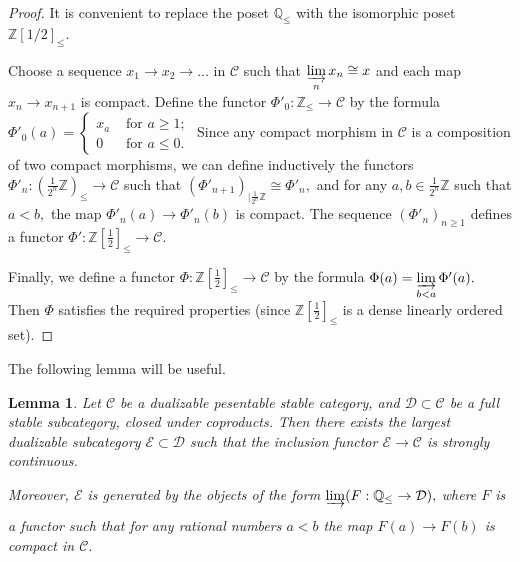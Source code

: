 \documentclass[11pt,leqno]{amsart}
\newtheorem{lemma}[theo]{Lemma}
\numberwithin{equation}{section}
\def\Z{\mathbb{Z}}
\def\Q{\mathbb{Q}}
\newcommand{\indlim}[1][]{\mathop{\varinjlim}\limits_{#1}}
\newcommand{\cD}{{\mathcal D}}
\newcommand{\cC}{{\mathcal C}}
\newcommand{\cE}{{\mathcal E}}
\begin{document}
\begin{proof}It is convenient to replace the poset $\Q_{\leq}$ with the isomorphic poset $\Z[1/2]_{\leq}.$

Choose a sequence $x_1\to x_2\to\dots$ in $\cC$ such that $\indlim[n] x_n\cong x$ and each map $x_n\to x_{n+1}$ is compact. Define the functor $\Phi'_0:\Z_{\leq}\to \cC$ by the formula $\Phi'_0(a)=\begin{cases}x_a & \text{ for }a\geq 1;\\
0 & \text{ for }a\leq 0.\end{cases}$ Since any compact morphism in $\cC$ is a composition of two compact morphisms, we can define inductively the functors $\Phi'_n:(\frac{1}{2^n}\Z)_{\leq}\to \cC$ such that $(\Phi'_{n+1})_{\mid \frac{1}{2^n}\Z}\cong \Phi'_n,$ and for any $a,b\in\frac{1}{2^n}\Z$ such that $a<b,$ the map $\Phi'_n(a)\to\Phi'_n(b)$ is compact. The sequence $(\Phi'_n)_{n\geq 1}$ defines a functor $\Phi':\Z[\frac{1}{2}]_{\leq}\to\cC.$

Finally, we define a functor $\Phi:\Z[\frac{1}{2}]_{\leq}\to\cC$ by the formula $\Phi(a)=\indlim[b<a]\Phi'(a).$ Then $\Phi$ satisfies the required properties (since $\Z[\frac12]_{\leq}$ is a dense linearly ordered set).\end{proof}

The following lemma will be useful.

\begin{lemma}\label{lem:largest_dualizable} Let $\cC$ be a dualizable pesentable stable category, and $\cD\subset\cC$ be a full stable subcategory, closed under coproducts. Then there exists the largest dualizable subcategory $\cE\subset\cD$ such that the inclusion functor $\cE\to\cC$ is strongly continuous.

Moreover, $\cE$ is generated by the objects of the form $\indlim[](F:\Q_{\leq}\to\cD),$ where $F$ is a functor such that for any rational numbers $a<b$ the map $F(a)\to F(b)$ is compact in $\cC.$\end{lemma}
\end{document}

